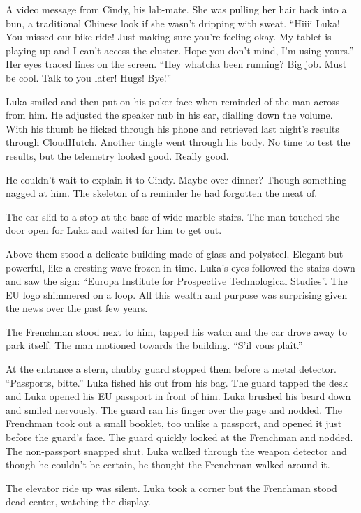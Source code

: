 \documentclass[ebook,11pt,oneside,openany]{memoir}
\newcommand{\scenechange}{
  \par
  \vspace{\baselineskip}
  \par
\noindent}
\begin{document}
A video message from Cindy, his lab-mate. She was pulling her hair back into a bun, a traditional Chinese look if she wasn't dripping with sweat. ``Hiiii Luka! You missed our bike ride! Just making sure you're feeling okay. My tablet is playing up and I can't access the cluster. Hope you don't mind, I'm using yours.'' Her eyes traced lines on the screen. ``Hey whatcha been running? Big job. Must be cool. Talk to you later! Hugs! Bye!''

Luka smiled and then put on his poker face when reminded of the man across from him. He adjusted the speaker nub in his ear, dialling down the volume. With his thumb he flicked through his phone and retrieved last night's results through CloudHutch. Another tingle went through his body. No time to test the results, but the telemetry looked good. Really good.

He couldn't wait to explain it to Cindy. Maybe over dinner? Though something nagged at him. The skeleton of a reminder he had forgotten the meat of.

The car slid to a stop at the base of wide marble stairs. The man touched the door open for Luka and waited for him to get out.

Above them stood a delicate building made of glass and polysteel. Elegant but powerful, like a cresting wave frozen in time. Luka's eyes followed the stairs down and saw the sign: ``Europa Institute for Prospective Technological Studies''. The EU logo shimmered on a loop. All this wealth and purpose was surprising given the news over the past few years.

The Frenchman stood next to him, tapped his watch and the car drove away to park itself. The man motioned towards the building. ``S'il vous plaît.''

At the entrance a stern, chubby guard stopped them before a metal detector. ``Passports, bitte.'' Luka fished his out from his bag. The guard tapped the desk and Luka opened his EU passport in front of him. Luka brushed his beard down and smiled nervously. The guard ran his finger over the page and nodded. The Frenchman took out a small booklet, too unlike a passport, and opened it just before the guard's face. The guard quickly looked at the Frenchman and nodded. The non-passport snapped shut. Luka walked through the weapon detector and though he couldn't be certain, he thought the Frenchman walked around it.

\scenechange

The elevator ride up was silent. Luka took a corner but the Frenchman stood dead center, watching the display.
\end{document}
